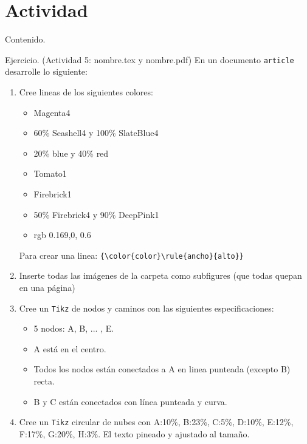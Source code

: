 \documentclass[dvipsnames,xcolor=x11names]{beamer}
\theoremstyle{plain}
\theoremstyle{definition}
\begin{document}
\section{Actividad} 
\begin{frame}{Contenido.}
  \tableofcontents[currentsection]
\end{frame}
\begin{frame}[fragile]{Ejercicio. (Actividad 5: nombre.tex y nombre.pdf)}
En un documento \verb!article! desarrolle lo siguiente:
\begin{scriptsize}
\begin{multicols}{2}
\begin{enumerate}
    \item Cree lineas de los siguientes colores:
    \begin{itemize}
        \item Magenta4
        \item 60\% Seashell4 y 100\% SlateBlue4
        \item 20\% blue y 40\% red
        \item Tomato1
        \item Firebrick1
        \item 50\% Firebrick4 y 90\% DeepPink1
        \item rgb 0.169,0, 0.6 
    \end{itemize}
    Para crear una linea: \verb!{\color{color}\rule{ancho}{alto}}!
    \item Inserte todas las imágenes de la carpeta como subfigures (que todas quepan en una página)
    \item Cree un \verb!Tikz! de nodos y caminos con las siguientes especificaciones:
    \begin{itemize}
        \item 5 nodos: A, B, ... , E.
        \item A está en el centro.
        \item Todos los nodos están conectados a A en linea punteada (excepto B) recta.
        \item B y C están conectados con línea punteada y curva. 
    \end{itemize}
    \item Cree un \verb!Tikz! circular de nubes con A:10\%, B:23\%, C:5\%, D:10\%, E:12\%, F:17\%, G:20\%, H:3\%. El texto pineado y ajustado al tamaño. 
\end{enumerate}
\end{multicols}
\end{scriptsize}
\end{frame}
{
    \begin{frame}
    \vfill
    \begin{center}
    \begin{Huge}
    \end{Huge}
    \end{center}
    \vfill
     \end{frame}
}
            
\end{document}
